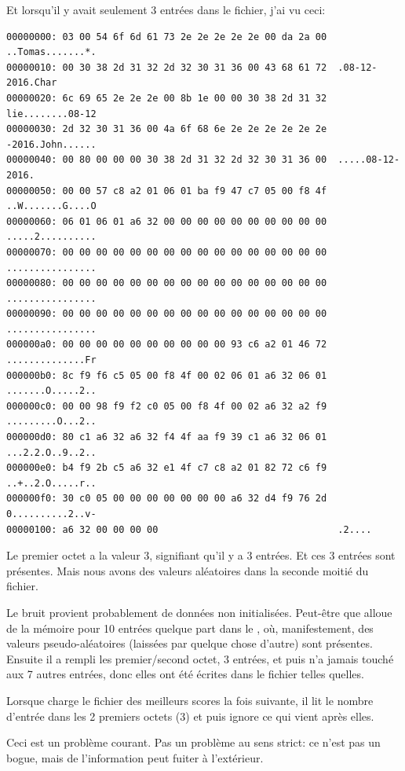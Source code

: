 Et lorsqu'il y avait seulement 3 entrées dans le fichier, j'ai vu ceci:

\begin{lstlisting}
00000000: 03 00 54 6f 6d 61 73 2e 2e 2e 2e 2e 00 da 2a 00  ..Tomas.......*.
00000010: 00 30 38 2d 31 32 2d 32 30 31 36 00 43 68 61 72  .08-12-2016.Char
00000020: 6c 69 65 2e 2e 2e 00 8b 1e 00 00 30 38 2d 31 32  lie........08-12
00000030: 2d 32 30 31 36 00 4a 6f 68 6e 2e 2e 2e 2e 2e 2e  -2016.John......
00000040: 00 80 00 00 00 30 38 2d 31 32 2d 32 30 31 36 00  .....08-12-2016.
00000050: 00 00 57 c8 a2 01 06 01 ba f9 47 c7 05 00 f8 4f  ..W.......G....O
00000060: 06 01 06 01 a6 32 00 00 00 00 00 00 00 00 00 00  .....2..........
00000070: 00 00 00 00 00 00 00 00 00 00 00 00 00 00 00 00  ................
00000080: 00 00 00 00 00 00 00 00 00 00 00 00 00 00 00 00  ................
00000090: 00 00 00 00 00 00 00 00 00 00 00 00 00 00 00 00  ................
000000a0: 00 00 00 00 00 00 00 00 00 00 93 c6 a2 01 46 72  ..............Fr
000000b0: 8c f9 f6 c5 05 00 f8 4f 00 02 06 01 a6 32 06 01  .......O.....2..
000000c0: 00 00 98 f9 f2 c0 05 00 f8 4f 00 02 a6 32 a2 f9  .........O...2..
000000d0: 80 c1 a6 32 a6 32 f4 4f aa f9 39 c1 a6 32 06 01  ...2.2.O..9..2..
000000e0: b4 f9 2b c5 a6 32 e1 4f c7 c8 a2 01 82 72 c6 f9  ..+..2.O.....r..
000000f0: 30 c0 05 00 00 00 00 00 00 00 a6 32 d4 f9 76 2d  0..........2..v-
00000100: a6 32 00 00 00 00                                .2....
\end{lstlisting}

Le premier octet a la valeur 3, signifiant qu'il y a 3 entrées.
Et ces 3 entrées sont présentes.
Mais nous avons des valeurs aléatoires dans la seconde moitié du fichier.

Le bruit provient probablement de données non initialisées.
Peut-être que  alloue de la mémoire pour 10 entrées quelque part dans
le , où, manifestement, des valeurs pseudo-aléatoires (laissées
par quelque chose d'autre) sont présentes.
Ensuite il a rempli les premier/second octet, 3 entrées, et puis n'a jamais touché
aux 7 autres entrées, donc elles ont été écrites dans le fichier telles quelles.

Lorsque  charge le fichier des meilleurs scores la fois suivante, il
lit le nombre d'entrée dans les 2 premiers octets (3) et puis ignore ce qui vient
après elles.

Ceci est un problème courant.
Pas un problème au sens strict: ce n'est pas un bogue, mais de l'information peut
fuiter à l'extérieur.

